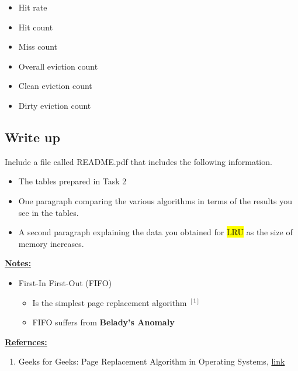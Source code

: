 \documentclass[12pt]{article}
\begin{document}
\bigskip

\begin{itemize}
    \item Hit rate
    \item Hit count
    \item Miss count
    \item Overall eviction count
    \item Clean eviction count
    \item Dirty eviction count
\end{itemize}


\subsection{Write up}

\noindent Include a file called README.pdf that includes the following information.

\begin{itemize}
    \item The tables prepared in Task 2
    \item One paragraph comparing the various algorithms in terms of the results
    you see in the tables.
    \item A second paragraph explaining the data you obtained for \hl{LRU} as the size
    of memory increases.
\end{itemize}

\bigskip

\underline{\textbf{Notes:}}

\bigskip

\begin{itemize}
    \item First-In First-Out (FIFO)
    \begin{itemize}
        \item Is the simplest page replacement algorithm $^{[1]}$
        \item FIFO suffers from \textbf{Belady's Anomaly}
    \end{itemize}
\end{itemize}

\bigskip

\underline{\textbf{Refernces:}}

\bigskip

\begin{enumerate}[1)]
    \item Geeks for Geeks: Page Replacement Algorithm in Operating Systems, \href{https://www.geeksforgeeks.org/page-replacement-algorithms-in-operating-systems/#:~:text=First%20In%20First%20Out%20(FIFO,queue%20is%20selected%20for%20removal.}{link}
\end{enumerate}
\end{document}
